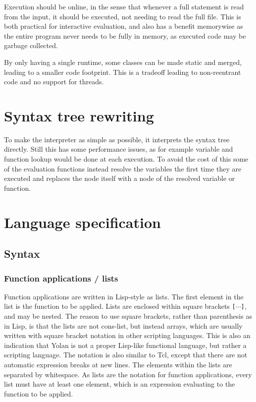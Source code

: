 \documentclass[11pt]{report}
\begin{document}
Execution should be online, in the sense that whenever a full statement is read from the input, it should be executed, not needing to read the full file. This is both practical for interactive evaluation, and also has a benefit memorywise as the entire program never needs to be fully in memory, as executed code may be garbage collected.

By only having a single runtime, some classes can be made static and merged, leading to a smaller code footprint. This is a tradeoff leading to non-reentrant code and no support for threads.

\section{Syntax tree rewriting}

To make the interpreter as simple as possible, it interprets the syntax tree directly. Still this has some performance issues, as for example variable and function lookup would be done at each execution. To avoid the cost of this some of the evaluation functions instead resolve the variables the first time they are executed and replaces the node itself with a node of the resolved variable or function.

\section{Language specification}

\subsection{Syntax}
\subsubsection{Function applications / lists}
Function applications are written in Lisp-style as lists. The first element in the list is the function to be applied.
Lists are enclosed within square brackets \verb|[|$\cdots$\verb|]|, and may be nested. 
The reason to use square brackets, rather than parenthesis as in Lisp, is that the lists are not cons-list, but instead arrays, which are usually written with square bracket notation in other scripting languages. This is also an indication that Yolan is not a proper Lisp-like functional language, but rather a scripting language. The notation is also similar to Tcl, except that there are not automatic expression breaks at new lines.
The elements within the lists are separated by whitespace. 
As lists are the notation for function applications, every list must have at least one element, which is an expression evaluating to the function to be applied.
\end{document}
